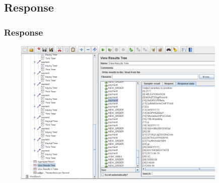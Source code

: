 \documentclass[12pt]{beamer}
\begin{document}
\subsection{Response}
\begin{frame}[c]
\frametitle{Response}
\centering
   \includegraphics[width=12cm, height=7cm]{images/response}

\end{frame}


\end{document}
